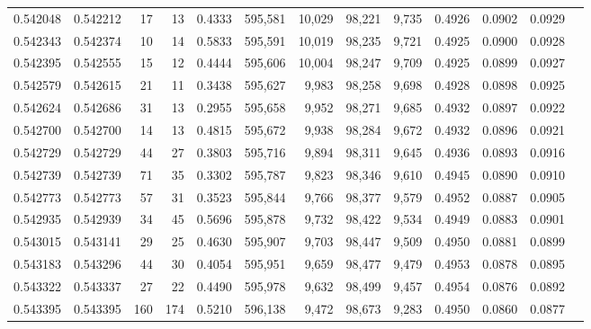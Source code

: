 \begin{tabular}{rrrrrrrrrrrrr}
0.542048 & 0.542212 &    17 &    13 &                                     0.4333 & 595,581 &  10,029 &  98,221 &   9,735 & 0.4926 & 0.0902 & 0.0929 \\
0.542343 & 0.542374 &    10 &    14 &                                     0.5833 & 595,591 &  10,019 &  98,235 &   9,721 & 0.4925 & 0.0900 & 0.0928 \\
0.542395 & 0.542555 &    15 &    12 &                                     0.4444 & 595,606 &  10,004 &  98,247 &   9,709 & 0.4925 & 0.0899 & 0.0927 \\
0.542579 & 0.542615 &    21 &    11 &                                     0.3438 & 595,627 &   9,983 &  98,258 &   9,698 & 0.4928 & 0.0898 & 0.0925 \\
0.542624 & 0.542686 &    31 &    13 &                                     0.2955 & 595,658 &   9,952 &  98,271 &   9,685 & 0.4932 & 0.0897 & 0.0922 \\
0.542700 & 0.542700 &    14 &    13 &                                     0.4815 & 595,672 &   9,938 &  98,284 &   9,672 & 0.4932 & 0.0896 & 0.0921 \\
0.542729 & 0.542729 &    44 &    27 &                                     0.3803 & 595,716 &   9,894 &  98,311 &   9,645 & 0.4936 & 0.0893 & 0.0916 \\
0.542739 & 0.542739 &    71 &    35 &                                     0.3302 & 595,787 &   9,823 &  98,346 &   9,610 & 0.4945 & 0.0890 & 0.0910 \\
0.542773 & 0.542773 &    57 &    31 &                                     0.3523 & 595,844 &   9,766 &  98,377 &   9,579 & 0.4952 & 0.0887 & 0.0905 \\
0.542935 & 0.542939 &    34 &    45 &                                     0.5696 & 595,878 &   9,732 &  98,422 &   9,534 & 0.4949 & 0.0883 & 0.0901 \\
0.543015 & 0.543141 &    29 &    25 &                                     0.4630 & 595,907 &   9,703 &  98,447 &   9,509 & 0.4950 & 0.0881 & 0.0899 \\
0.543183 & 0.543296 &    44 &    30 &                                     0.4054 & 595,951 &   9,659 &  98,477 &   9,479 & 0.4953 & 0.0878 & 0.0895 \\
0.543322 & 0.543337 &    27 &    22 &                                     0.4490 & 595,978 &   9,632 &  98,499 &   9,457 & 0.4954 & 0.0876 & 0.0892 \\
0.543395 & 0.543395 &   160 &   174 &                                     0.5210 & 596,138 &   9,472 &  98,673 &   9,283 & 0.4950 & 0.0860 & 0.0877 \\

\end{tabular}
